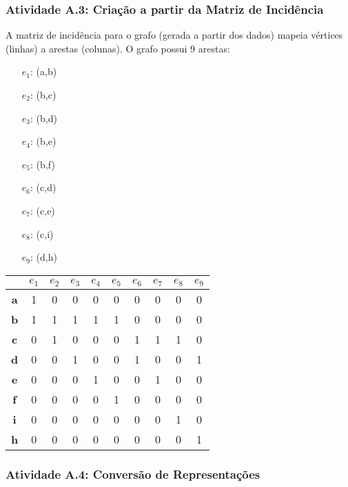 \documentclass[a4paper,12pt]{article}
\begin{document}
\subsubsection*{Atividade A.3: Criação a partir da Matriz de Incidência}
A matriz de incidência para o grafo (gerada a partir dos dados) mapeia vértices (linhas) a arestas (colunas). O grafo possui 9 arestas:
\begin{multicols}{2}
\begin{itemize}[nosep, leftmargin=*]
    \item[$e_1$:] (a,b) \quad \item[$e_2$:] (b,c) \quad \item[$e_3$:] (b,d)
    \item[$e_4$:] (b,e) \quad \item[$e_5$:] (b,f) \quad \item[$e_6$:] (c,d)
    \item[$e_7$:] (c,e) \quad \item[$e_8$:] (c,i) \quad \item[$e_9$:] (d,h)
\end{itemize}
\end{multicols}
\begin{center}
\scriptsize
\begin{tabular*}{\textwidth}{c|@{\extracolsep{\fill}}ccccccccc}
\rowcolor[gray]{0.9}
 & \textbf{$e_1$} & \textbf{$e_2$} & \textbf{$e_3$} & \textbf{$e_4$} & \textbf{$e_5$} & \textbf{$e_6$} & \textbf{$e_7$} & \textbf{$e_8$} & \textbf{$e_9$} \\
\hline
\textbf{a} & 1 & 0 & 0 & 0 & 0 & 0 & 0 & 0 & 0 \\
\textbf{b} & 1 & 1 & 1 & 1 & 1 & 0 & 0 & 0 & 0 \\
\textbf{c} & 0 & 1 & 0 & 0 & 0 & 1 & 1 & 1 & 0 \\
\textbf{d} & 0 & 0 & 1 & 0 & 0 & 1 & 0 & 0 & 1 \\
\textbf{e} & 0 & 0 & 0 & 1 & 0 & 0 & 1 & 0 & 0 \\
\textbf{f} & 0 & 0 & 0 & 0 & 1 & 0 & 0 & 0 & 0 \\
\textbf{i} & 0 & 0 & 0 & 0 & 0 & 0 & 0 & 1 & 0 \\
\textbf{h} & 0 & 0 & 0 & 0 & 0 & 0 & 0 & 0 & 1 \\
\end{tabular*}
\end{center}

\subsubsection*{Atividade A.4: Conversão de Representações}
\end{document}
